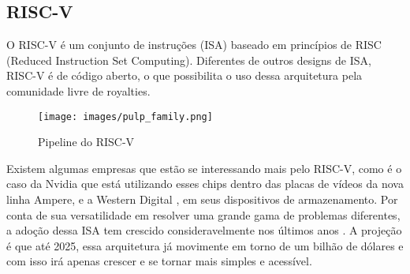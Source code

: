 \subsection{RISC-V}

O RISC-V é um conjunto de instruções (ISA) baseado em princípios de RISC (Reduced Instruction Set Computing). 
Diferentes de outros designs de ISA, RISC-V é de código aberto, o que possibilita o uso dessa arquitetura pela 
comunidade livre de royalties.

    \begin{figure}[h!]
        \centering
        \texttt{[image: images/pulp\_family.png]}
        \caption{Pipeline do RISC-V \\ \cite{PULP-Plataform} } %
    \end{figure}

Existem algumas empresas que estão se interessando mais pelo RISC-V, como é o caso da Nvidia \cite{Nvidia_Riscv} que 
está utilizando esses chips dentro das placas de vídeos da nova linha Ampere, e a Western Digital \cite{WesternDigital_Riscv}, 
em seus dispositivos de armazenamento. Por conta de sua versatilidade em resolver uma grande gama de problemas diferentes, 
a adoção dessa ISA tem crescido consideravelmente nos últimos anos \cite{RISCV_growth}. A projeção é que até 2025, essa 
arquitetura já movimente em torno de um bilhão de dólares \cite{RISCV_market_growth} e com isso irá apenas crescer e se 
tornar mais simples e acessível.
